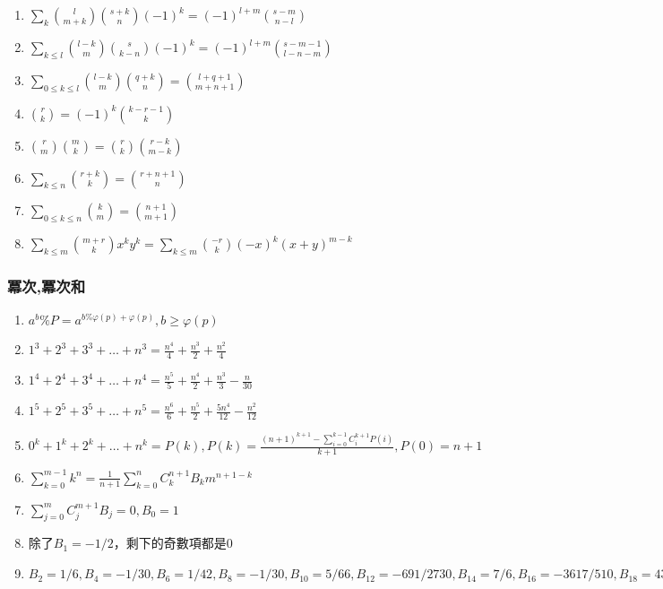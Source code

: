 \begin{enumerate}
\begin{enumerate}
         \item $\sum_k \binom{l}{m + k} \binom{s + k}{n}(-1)^k = (-1)^{l + m} \binom{s - m}{n - l}$
		\item $\sum_{k\leq l} \binom{l - k}{m} \binom{s}{k - n}(-1)^k = (-1)^{l + m} \binom{s - m - 1}{l - n - m}$
		\item $\sum_{0 \leq k \leq l} \binom{l - k}{m} \binom{q + k}{n} = \binom{l + q + 1}{m + n + 1}$
		\item $\binom{r}{k} = (-1)^k\binom{k - r - 1}{k}$
		\item $\binom{r}{m} \binom{m}{k} = \binom{r}{k} \binom{r - k}{m - k}$
		\item $\sum_{k\leq n} \binom{r + k}{k} = \binom{r + n + 1}{n}$
		\item $\sum_{0\leq k \leq n} \binom{k}{m} = \binom{n + 1}{m + 1}$
		\item $\sum_{k\leq m}\binom{m + r}{k}x^ky^k = \sum_{k\leq m}\binom{-r}{k}(-x)^k (x+y)^{m-k}$	
	\end{enumerate}
\end{enumerate}


\subsubsection{冪次,冪次和}
\begin{enumerate}\itemsep = -3pt
	\item $a^b\%P=a^{b\% \varphi (p)+\varphi (p)},b\geq \varphi (p)$
	\item $1^3+2^3+3^3+\ldots +n^3=\frac{n^4}{4}+\frac{n^3}{2}+\frac{n^2}{4}$
	\item $1^4+2^4+3^4+\ldots +n^4=\frac{n^5}{5}+\frac{n^4}{2}+\frac{n^3}{3}-\frac{n}{30}$
	\item $1^5+2^5+3^5+\ldots +n^5=\frac{n^6}{6}+\frac{n^5}{2}+\frac{5n^4}{12}-\frac{n^2}{12}$
	\item $0^k+1^k+2^k+\ldots +n^k = P(k),P(k)=\frac{(n+1)^{k+1}-\sum_{i=0}^{k-1}C_i^{k+1}P(i)}{k+1},P(0)=n+1$
	\item $\sum_{k=0}^{m-1}k^n=\frac{1}{n+1}\sum_{k=0}^{n}C_k^{n+1}B_km^{n+1-k}$
	\item $\sum_{j=0}^{m}C_j^{m+1}B_j=0,B_0=1$
	\item 除了$B_1=-1/2$，剩下的奇數項都是$0$
	\item $B_2=1/6,B_4=-1/30,B_6=1/42,B_8=-1/30,B_{10}=5/66,B_{12}=-691/2730,B_{14}=7/6,B_{16}=-3617/510,B_{18}=43867/798,B_{20}=-174611/330,$
\end{enumerate}

